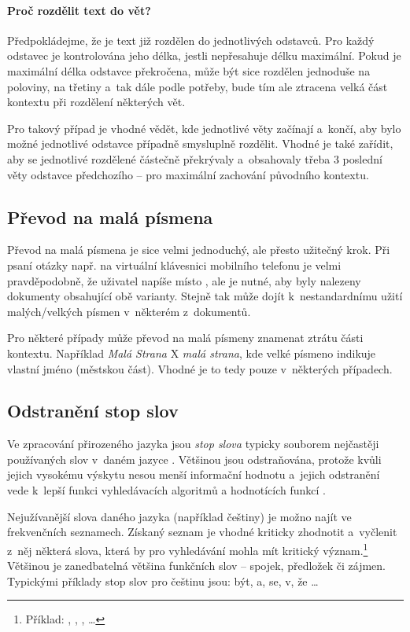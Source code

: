 \paragraph{Proč rozdělit text do vět?}
Předpokládejme, že je text již rozdělen do jednotlivých odstavců. Pro každý odstavec je kontrolována jeho délka, jestli nepřesahuje délku maximální. Pokud je maximální délka odstavce překročena, může být sice rozdělen jednoduše na poloviny, na třetiny a~tak dále podle potřeby, bude tím ale ztracena velká část kontextu při rozdělení některých vět.\par
Pro takový případ je vhodné vědět, kde jednotlivé věty začínají a~končí, aby bylo možné jednotlivé odstavce případně smysluplně rozdělit. Vhodné je také zařídit, aby se jednotlivé rozdělené  částečně překrývaly a~obsahovaly třeba 3 poslední věty odstavce předchozího -- pro maximální zachování původního kontextu.

\subsection{Převod na malá písmena}
\label{prevod_na_mala}
Převod na malá písmena je sice velmi jednoduchý, ale přesto užitečný krok. Při psaní otázky např. na virtuální klávesnici mobilního telefonu je velmi pravděpodobně, že uživatel napíše  místo , ale je nutné, aby byly nalezeny dokumenty obsahující obě varianty. Stejně tak může dojít k~nestandardnímu užití malých/velkých písmen v~některém z~dokumentů.\par
Pro některé případy může převod na malá písmeny znamenat ztrátu části kontextu. Například \emph{Malá Strana} X \emph{malá strana}, kde velké písmeno indikuje vlastní jméno (městskou část). Vhodné je to tedy pouze v~některých případech.

\subsection{Odstranění stop slov}
\label{stopwords}
Ve zpracování přirozeného jazyka jsou \emph{stop slova} typicky souborem nejčastěji používaných slov v~daném jazyce \cite{information_retrieval}. Většinou jsou odstraňována, protože kvůli jejich vysokému výskytu nesou menší informační hodnotu a~jejich odstranění vede k~lepší funkci vyhledávacích algoritmů a hodnotících funkcí \cite{bm25_improvements}.\par
Nejužívanější slova daného jazyka (například češtiny) je možno najít ve frekvenčních seznamech. Získaný seznam je vhodné kriticky zhodnotit a~vyčlenit z~něj některá slova, která by pro vyhledávání mohla mít kritický význam.\footnote{Příklad: , , , \dots} Většinou je zanedbatelná většina funkčních slov -- spojek, předložek či zájmen. Typickými příklady stop slov pro češtinu jsou: být, a, se, v, že \dots

